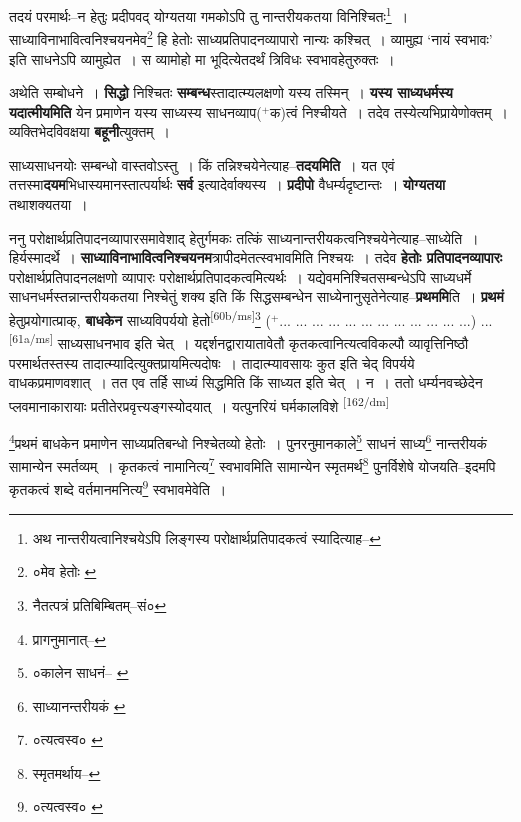 \documentclass[article,12pt,a4paper]{memoir}
\newcommand{\add}[1]{($^{+}$#1)}
\begin{document}
	तदयं परमार्थः--न हेतुः प्रदीपवद् योग्यतया गमकोऽपि तु नान्तरीयकतया विनिश्चितः\footnote{अथ नान्तरीयत्वानिश्चयेऽपि लिङ्गस्य परोक्षार्थप्रतिपादकत्वं स्यादित्याह--\cite{dp-msD-n}} । साध्याविनाभावित्वनिश्चयनमेव\footnote{०मेव हेतोः \cite{dp-msB}} हि हेतोः साध्यप्रतिपादनव्यापारो नान्यः कश्चित् । व्यामुह्य ‘नायं स्वभावः’ इति साधनेऽपि व्यामुह्येत । स व्यामोहो मा भूदित्येतदर्थं त्रिविधः स्वभावहेतुरुक्तः ।
	\pend
      

	  \pstart अथेति सम्बोधने । \textbf{सिद्धो} निश्चितः \textbf{सम्बन्ध}स्तादात्म्यलक्षणो यस्य तस्मिन् । \textbf{यस्य साध्यधर्मस्य यदात्मीयमिति} येन प्रमाणेन यस्य साध्यस्य साधनव्याप\add{क}त्वं निश्चीयते । तदेव तस्येत्यभिप्रायेणोक्तम् । व्यक्तिभेदविवक्षया \textbf{बहूनी}त्युक्तम् ।
	\pend
      

	  \pstart साध्यसाधनयोः सम्बन्धो वास्तवोऽस्तु । किं तन्निश्चयेनेत्याह--\textbf{तदयमिति} । यत एवं तत्तस्मा\textbf{दयम}भिधास्यमानस्तात्पर्यार्थः \textbf{सर्व} इत्यादेर्वाक्यस्य । \textbf{प्रदीपो} वैधर्म्यदृष्टान्तः । \textbf{योग्यतया} तथाशक्यतया ।
	\pend
      

	  \pstart ननु परोक्षार्थप्रतिपादनव्यापारसमावेशाद् हेतुर्गमकः तत्किं साध्यनान्तरीयकत्वनिश्चयेनेत्याह--साध्येति । हिर्यस्मादर्थे । \textbf{साध्याविनाभावित्वनिश्चयनम}त्रापीदमेतत्स्वभावमिति निश्चयः । तदेव \textbf{हेतोः प्रतिपादनव्यापारः} परोक्षार्थप्रतिपादनलक्षणो व्यापारः परोक्षार्थप्रतिपादकत्वमित्यर्थः । यद्येवमनिश्चितसम्बन्धेऽपि साध्यधर्मे साधनधर्मस्तन्नान्तरीयकतया निश्चेतुं शक्य इति किं सिद्धसम्बन्धेन साध्येनानुसृतेनेत्याह--\textbf{प्रथममि}ति । \textbf{प्रथमं} हेतुप्रयोगात्प्राक्, \textbf{बाधकेन} साध्यविपर्ययो हेतो\leavevmode\textsuperscript{\rmlatinfont\tiny [60b/ms]}\footnote{नैतत्पत्रं प्रतिबिम्बितम्--सं०} \add{... ... ... ... ... ... ... ... ... ... ... ...} ...\leavevmode\textsuperscript{\rmlatinfont\tiny [61a/ms]} साध्यसाधनभाव इति चेत् । यद्दर्शनद्वारायातावेतौ कृतकत्वानित्यत्वविकल्पौ व्यावृत्तिनिष्ठौ परमार्थतस्तस्य तादात्म्यादित्युक्तप्रायमित्यदोषः । तादात्म्यावसायः कुत इति चेद् विपर्यये वाधकप्रमाणवशात् । तत एव तर्हि साध्यं सिद्धमिति किं साध्यत इति चेत् । न । ततो धर्म्यनवच्छेदेन प्लवमानाकारायाः प्रतीतेरप्रवृत्त्यङ्गस्योदयात् । यत्पुनरियं घर्मकालविशे  \leavevmode\textsuperscript{\rmlatinfont\tiny [162/dm]} 
	  
	\footnote{प्रागनुमानात्--\cite{dp-msD-n}}प्रथमं बाधकेन प्रमाणेन साध्यप्रतिबन्धो निश्चेतव्यो हेतोः । पुनरनुमानकाले\footnote{०कालेन साधनं--\cite{dp-msA} \cite{dp-msB} \cite{dp-edP} \cite{dp-edH} \cite{dp-edE}} साधनं साध्य\footnote{साध्यानन्तरीयकं \cite{dp-msA} \cite{dp-msB} \cite{dp-edP} \cite{dp-edH} \cite{dp-edE}} नान्तरीयकं सामान्येन स्मर्तव्यम् । कृतकत्वं नामानित्य\footnote{०त्यत्वस्व० \cite{dp-msA} \cite{dp-msB} \cite{dp-edP} \cite{dp-edH} \cite{dp-edE} \cite{dp-edN}} स्वभावमिति सामान्येन स्मृतमर्थ\footnote{स्मृतमर्थाय--\cite{dp-msB}} पुनर्विशेषे योजयति--इदमपि कृतकत्वं शब्दे वर्तमानमनित्य\footnote{०त्यत्वस्व० \cite{dp-msC}} स्वभावमेवेति । 
	  
\end{document}
